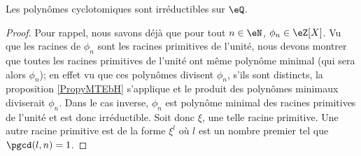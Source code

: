 \begin{proposition}      \label{PropoIeOVh}
    Les polynômes cyclotomiques sont irréductibles sur \( \eQ\).
\end{proposition}

\begin{proof}
    Pour rappel, nous savons déjà que pour tout \( n\in\eN\), \( \phi_n\in \eZ[X]\). Vu que les racines de \( \phi_n\) sont les racines primitives de l'unité, nous devons montrer que toutes les racines primitives de l'unité ont même polynôme minimal (qui sera alors \( \phi_n\)); en effet vu que ces polynômes divisent \( \phi_n\), s'ils sont distincts, la proposition \ref{PropyMTEbH} s'applique et le produit des polynômes minimaux diviserait \( \phi_n\). Dans le cas inverse, \( \phi_n\) est polynôme minimal des racines primitives de l'unité et est donc irréductible. Soit donc \( \xi\), une telle racine primitive. Une autre racine primitive est de la forme \( \xi^l\) où \( l\) est un nombre premier tel que \( \pgcd(l,n)=1\).


\end{proof}
